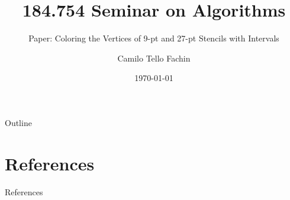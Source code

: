 \documentclass[10pt]{beamer}
\title[Seminar on Algorithms]{%
  184.754 Seminar on Algorithms 
}
\subtitle{Paper: Coloring the Vertices of 9-pt and 27-pt Stencils
with Intervals}
\author{Camilo Tello Fachin}
\date{\today}
\begin{document}
\begin{frame}
  \titlepage
\end{frame}

\begin{frame}{Outline}
  \tableofcontents
\end{frame}













\section{References}
\begin{frame}{References}

  \tiny\printbibliography
  
\end{frame}
\end{document}
